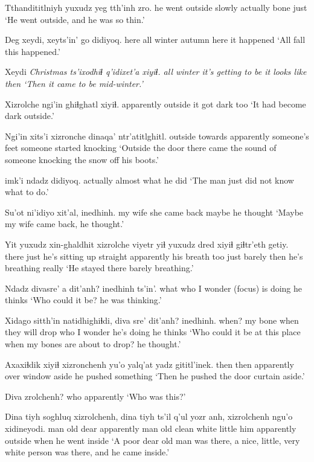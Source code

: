 \documentclass[12pt]{article}
\begin{document}
 Tthandititlniyh {yuxudz yeg} tth'inh zro.
{} {he went outside slowly} actually bone just
\glt `He went outside, and he was so thin.'
\glend

\gll Deg xeydi, xeyts'in' go didiyoq.
here {all winter} autumn here {it happened}
\glt `All fall this happened.'
\glend

\gll Xeydi \em Christmas ts'ixodhiɬ q'idixet'a xiyiɬ.
{all winter} {} {it's getting to be} {it looks like} then
\glt `Then it came to be mid-winter.'
\glend

\gll Xizrolche ngi'in ghiɬghatl xiyiɬ.
apparently outside {it got dark} too
\glt `It had become dark outside.'
\glend

\gll Ngi'in xits'i xizronche dinaqa' ntr'atitlghitl.
outside towards apparently {someone's feet} {someone started knocking}
\glt `Outside the door there came the sound of someone knocking the snow off his boots.'
\glend

 imk'i ndadz didiyoq.
actually almost what {he did}
\glt `The man just did not know what to do.'
\glend

\gll Su'ot ni'idiyo xit'al, inedhinh.
{my wife} {she came back} maybe {he thought}
\glt `Maybe my wife came back, he thought.'
\glend

\gll Yit yuxudz {xin-ghaldhit} {xizrolche} viyetr yiɬ yuxudz dred xiyiɬ giɬtr'eth getiy.
there just {he's sitting up straight} apparently {his breath} too just barely then {he's breathing} really
\glt `He stayed there barely breathing.'
\glend

\gll Ndadz divasre' a dit'anh? inedhinh ts'in'.
what {who I wonder} {(focus)} {is doing} {he thinks} {}
\glt `Who could it be? he was thinking.'
\glend

\gll Xidago sitth'in natidhighiɬdi, diva sre' dit'anh? inedhinh.
when? {my bone} {when they will drop} who {I wonder} {he's doing} {he thinks}
\glt `Who could it be at this place when my bones are about to drop? he thought.'
\glend

\gll Axaxiɬdik xiyiɬ {xizronchenh} yu'o yalq'at yadz gititl'inek.
then then apparently over window aside {he pushed something}
\glt `Then he pushed the door curtain aside.'
\glend

\gll Diva {zrolchenh?}
who apparently
\glt `Who was this?'
\glend

\gll Dina tiyh soghluq {xizrolchenh,} dina tiyh ts'il q'ul yozr anh, {xizrolchenh} ngu'o xidineyodi.
man old dear apparently man old clean white little him apparently outside {when he went inside}
\glt `A poor dear old man was there, a nice, little, very white person was there, and he came inside.'
\glend
\end{document}
